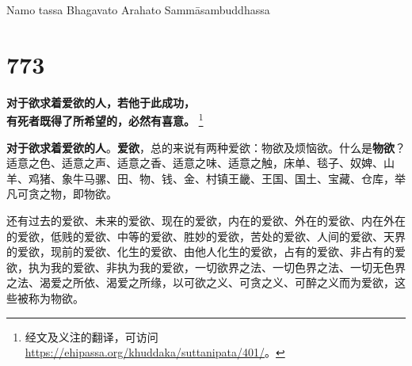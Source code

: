 \begin{center}
    Namo tassa Bhagavato Arahato Sammāsambuddhassa
\end{center}

\section*{773}

\begin{quoting}
    \textbf{对于欲求着爱欲的人，若他于此成功，\\有死者既得了所希望的，必然有喜意。}
    \footnote{经文及义注的翻译，可访问 \url{https://ehipassa.org/khuddaka/suttanipata/401/}。}
\end{quoting}


\textbf{对于欲求着爱欲的人}。\textbf{爱欲}，总的来说有两种爱欲：物欲及烦恼欲。什么是\textbf{物欲}？适意之色、适意之声、适意之香、适意之味、适意之触，床单、毯子、奴婢、山羊、鸡猪、象牛马骡、田、物、钱、金、村镇王畿、王国、国土、宝藏、仓库，举凡可贪之物，即物欲。


还有过去的爱欲、未来的爱欲、现在的爱欲，内在的爱欲、外在的爱欲、内在外在的爱欲，低贱的爱欲、中等的爱欲、胜妙的爱欲，苦处的爱欲、人间的爱欲、天界的爱欲，现前的爱欲、化生的爱欲、由他人化生的爱欲，占有的爱欲、非占有的爱欲，执为我的爱欲、非执为我的爱欲，一切欲界之法、一切色界之法、一切无色界之法、渴爱之所依、渴爱之所缘，以可欲之义、可贪之义、可醉之义而为爱欲，这些被称为物欲。



